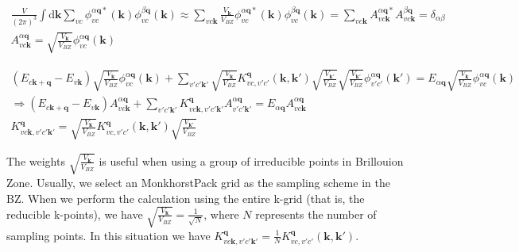 \begin{equation}
  \begin{gathered}
    \frac{V}{(2\pi)^3} \int \mathrm{d}\boldsymbol{k} \sum_{vc} 
      \phi_{vc}^{\alpha \boldsymbol{q}*}(\boldsymbol{k}) \phi_{vc}^{\beta \boldsymbol{q}}(\boldsymbol{k}) 
      \approx \sum_{vc\boldsymbol{k}} \frac{V_{\boldsymbol{k}}}{V_{BZ}} 
        \phi_{vc}^{\alpha \boldsymbol{q}*}(\boldsymbol{k}) \phi_{vc}^{\beta \boldsymbol{q}}(\boldsymbol{k}) 
      = \sum_{vc\boldsymbol{k}} A_{vc\boldsymbol{k}}^{\alpha \boldsymbol{q}*} A_{vc\boldsymbol{k}}^{\beta \boldsymbol{q}}
      = \delta_{\alpha\beta} \\
    A_{vc\boldsymbol{k}}^{\alpha \boldsymbol{q}}
      = \sqrt{\frac{V_{\boldsymbol{k}}}{V_{BZ}}} \phi_{vc}^{\alpha \boldsymbol{q}}(\boldsymbol{k}) 
  \end{gathered}
\end{equation}

\begin{equation}
  \begin{gathered}
    (E_{c\boldsymbol{k} + \boldsymbol{q}} - E_{v\boldsymbol{k}}) \sqrt{\frac{V_{\boldsymbol{k}}}{V_{BZ}}} \phi_{vc}^{\alpha\boldsymbol{q}}(\boldsymbol{k}) 
      + \sum_{v'c'\boldsymbol{k}'} \sqrt{\frac{V_{\boldsymbol{k}}}{V_{BZ}}} 
      K_{vc,v'c'}^{\boldsymbol{q}}(\boldsymbol{k},\boldsymbol{k}') \sqrt{\frac{V_{\boldsymbol{k}'}}{V_{BZ}}} 
      \sqrt{\frac{V_{\boldsymbol{k}'}}{V_{BZ}}} \phi_{v'c'}^{\alpha\boldsymbol{q}} (\boldsymbol{k}') 
    = E_{\alpha \boldsymbol{q}} \sqrt{\frac{V_{\boldsymbol{k}}}{V_{BZ}}} \phi_{vc}^{\alpha\boldsymbol{q}}(\boldsymbol{k}) \\
    \Rightarrow (E_{c\boldsymbol{k} + \boldsymbol{q}} - E_{v\boldsymbol{k}}) A_{vc\boldsymbol{k}}^{\alpha\boldsymbol{q}} 
      + \sum_{v'c'\boldsymbol{k}'} K_{vc\boldsymbol{k},v'c'\boldsymbol{k}'}^{\boldsymbol{q}}
      A_{v'c'\boldsymbol{k}'}^{\alpha\boldsymbol{q}} 
    = E_{\alpha \boldsymbol{q}} A_{vc\boldsymbol{k}}^{\alpha\boldsymbol{q}} \\
    K_{vc\boldsymbol{k},v'c'\boldsymbol{k}'}^{\boldsymbol{q}} 
    = \sqrt{\frac{V_{\boldsymbol{k}}}{V_{BZ}}} K_{vc,v'c'}^{\boldsymbol{q}}(\boldsymbol{k},\boldsymbol{k}') \sqrt{\frac{V_{\boldsymbol{k}'}}{V_{BZ}}} 
  \end{gathered}
\end{equation}

\noindent
The weights $\sqrt{\frac{V_{\boldsymbol{k}}}{V_{BZ}}}$ is useful when using a group of irreducible points in Brillouion Zone.
Usually, we select an MonkhorstPack grid as the sampling scheme in the BZ. 
When we perform the calculation using the entire k-grid (that is, the reducible k-points), 
we have $\sqrt{\frac{V_{\boldsymbol{k}}}{V_{BZ}}} = \frac{1}{\sqrt{N}}$, where $N$ represents the number of sampling points.
In this situation we have $K_{vc\boldsymbol{k},v'c'\boldsymbol{k}'}^{\boldsymbol{q}} = \frac{1}{N} K_{vc,v'c'}^{\boldsymbol{q}}(\boldsymbol{k},\boldsymbol{k}')$.

